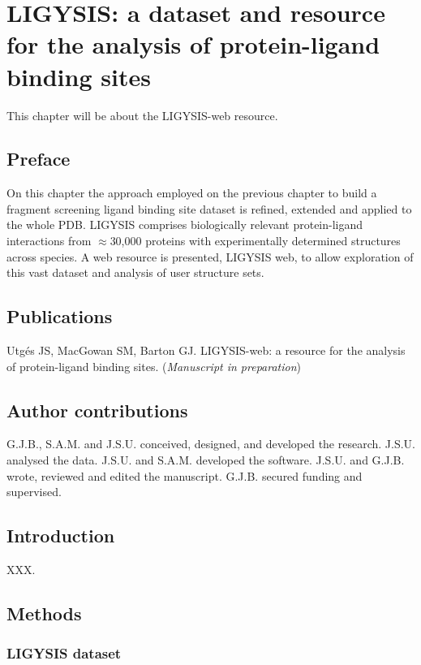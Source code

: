 \chapter{LIGYSIS: a dataset and resource for the analysis of protein-ligand binding sites}

This chapter will be about the LIGYSIS-web resource.

\section*{Preface}

On this chapter the approach employed on the previous chapter to build a fragment screening ligand binding site dataset is refined, extended and applied to the whole PDB. LIGYSIS comprises biologically relevant protein-ligand interactions from $\approx$30,000 proteins with experimentally determined structures across species. A web resource is presented, LIGYSIS web, to allow exploration of this vast dataset and analysis of user structure sets.

\section*{Publications}

Utgés JS, MacGowan SM, Barton GJ. LIGYSIS-web: a resource for the analysis of protein-ligand binding sites. (\textit{Manuscript in preparation})

\section*{Author contributions}

G.J.B., S.A.M. and J.S.U. conceived, designed, and developed the research. J.S.U. analysed the data. J.S.U. and S.A.M. developed the software. J.S.U. and G.J.B. wrote, reviewed and edited the manuscript. G.J.B. secured funding and supervised.

\section{Introduction}

XXX.

\section{Methods}

\subsection{LIGYSIS dataset}

